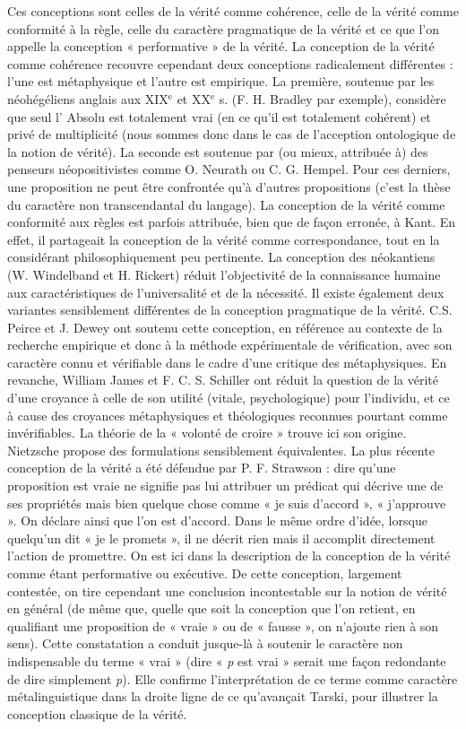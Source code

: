 Ces conceptions sont celles de la vérité
comme cohérence, celle de la vérité
comme conformité à la règle, celle du
caractère pragmatique de la vérité et ce
que l’on appelle la conception « performative »
de la vérité. La conception de la
vérité comme cohérence recouvre cependant
deux conceptions radicalement différentes :
l’une est métaphysique et l’autre
est empirique. La première, soutenue par
les néohégéliens anglais aux {\footnotesize XIX}$^\text{e}$
et {\footnotesize XX}$^\text{e}$ s.
(F. H. Bradley par exemple), considère
que seul l’ Absolu est totalement vrai (en
ce qu’il est totalement cohérent) et privé
de multiplicité (nous sommes donc dans
le cas de l’acception ontologique de la
notion de vérité). La seconde est soutenue
par (ou mieux, attribuée à) des penseurs
néopositivistes comme O. Neurath
ou C. G. Hempel. Pour ces derniers, une
proposition ne peut être confrontée qu’à
d’autres propositions (c’est la thèse du
caractère non transcendantal du langage).
La conception de la vérité comme conformité
aux règles est parfois attribuée, bien
que de façon erronée, à Kant. En effet, il
partageait la conception de la vérité
comme correspondance, tout en la considérant
philosophiquement peu  pertinente.
La conception des néokantiens
(W. Windelband et H. Rickert) réduit
l’objectivité de la connaissance humaine
aux caractéristiques de l’universalité et de
la nécessité. Il existe également deux
variantes sensiblement différentes de la
conception pragmatique de la vérité.
C.S. Peirce et J. Dewey ont soutenu cette
conception, en référence au contexte de la
recherche empirique et donc à la méthode
expérimentale de vérification, avec son
%
caractère connu et vérifiable dans le cadre
d’une critique des métaphysiques. En
revanche, William James et
F. C. S. Schiller ont réduit la question de
la vérité d’une croyance à celle de son utilité
(vitale, psychologique) pour l’individu,
et ce à cause des croyances
métaphysiques et théologiques reconnues
pourtant comme invérifiables. La théorie
de la « volonté de croire » trouve ici son
origine. Nietzsche propose des formulations
sensiblement équivalentes. La plus
récente conception de la vérité a été
défendue par P. F. Strawson : dire qu’une
proposition est vraie ne signifie pas lui
attribuer un prédicat qui décrive une de
ses propriétés mais bien quelque chose
comme « je suis d'accord », « j’approuve ».
On déclare ainsi que l’on est d’accord.
Dans le même ordre d’idée, lorsque
quelqu'un dit « je le promets », il ne décrit
rien mais il accomplit directement l’action
de promettre. On est ici dans la description
de la conception de la vérité comme
étant performative ou exécutive. De cette
conception, largement contestée, on tire
cependant une conclusion incontestable
sur la notion de vérité en général (de
même que, quelle que soit la conception
que l’on retient, en qualifiant une proposition
de « vraie » ou de « fausse », on
n’ajoute rien à son sens). Cette constatation
a conduit jusque-là à soutenir le
caractère non indispensable du terme
« vrai » (dire « {\it p} est vrai » serait une
façon redondante de dire simplement {\it p}).
Elle confirme l'interprétation de ce terme
comme caractère métalinguistique dans la
droite ligne de ce qu’avançait Tarski, pour
illustrer la conception classique de la
vérité.

